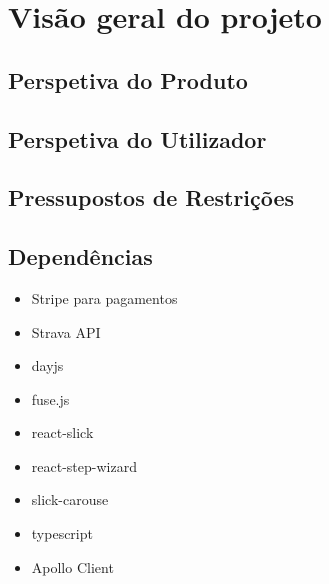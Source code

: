 \chapter{Visão geral do projeto}

\section{Perspetiva do Produto}

\section{Perspetiva do Utilizador}

\section{Pressupostos de Restrições}

\section{Dependências}

\begin{itemize}
	\item Stripe para pagamentos
	\item Strava API
	\item dayjs
	\item fuse.js
	\item react-slick
	\item react-step-wizard
	\item slick-carouse
	\item typescript
	\item Apollo Client
\end{itemize}